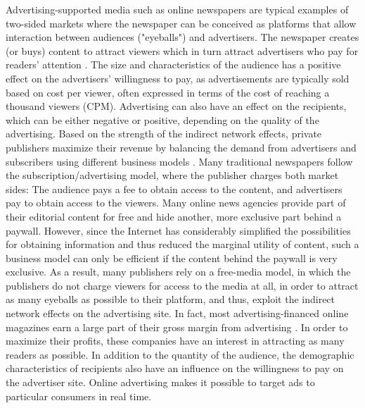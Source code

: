 \documentclass[12pt,a4paper,notitlepage]{article}
\begin{document}
Advertising-supported media such as online newspapers are typical examples of two-sided markets where the newspaper can be conceived as platforms that allow interaction between audiences ("eyeballs") and advertisers. The newspaper creates (or buys) content to attract viewers which in turn attract advertisers who pay for readers' attention \citep{evans_industrial_2005}. The size and characteristics of the audience has a positive effect on the advertisers' willingness to pay, as advertisements are typically sold based on cost per viewer, often expressed in terms of the cost of reaching a thousand viewers (CPM). Advertising can also have an effect on the recipients, which can be either negative or positive, depending on the quality of the advertising. Based on the strength of the indirect network effects, private publishers maximize their revenue by balancing the demand from advertisers and subscribers using different business models \citep{evans_economics_2008}. Many traditional newspapers follow the subscription/advertising model, where the publisher charges both market sides: The audience pays a fee to obtain access to the content, and advertisers pay to obtain access to the viewers. Many online news agencies provide part of their editorial content for free and hide another, more exclusive part behind a paywall. However, since the Internet has considerably simplified the possibilities for obtaining information and thus reduced the marginal utility of content, such a business model can only be efficient if the content behind the paywall is very exclusive. As a result, many publishers rely on a free-media model, in which the publishers do not charge viewers for access to the media at all, in order to attract as many eyeballs as possible to their platform, and thus, exploit the indirect network effects on the advertising site. In fact, most advertising-financed online magazines earn a large part of their gross margin from advertising \citep{evans_industrial_2005}. In order to maximize their profits, these companies have an interest in attracting as many readers as possible. In addition to the quantity of the audience, the demographic characteristics of recipients also have an influence on the willingness to pay on the advertiser site. Online advertising makes it possible to target ads to particular consumers in real time.
 
\end{document}
